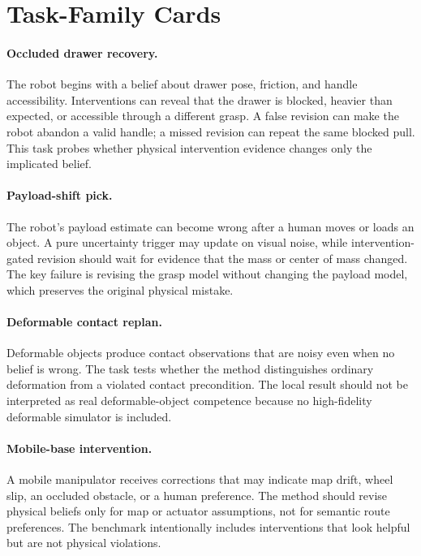 \documentclass{article}
\begin{document}
\clearpage
\section{Task-Family Cards}
\paragraph{Occluded drawer recovery.} The robot begins with a belief about drawer pose, friction, and handle accessibility. Interventions can reveal that the drawer is blocked, heavier than expected, or accessible through a different grasp. A false revision can make the robot abandon a valid handle; a missed revision can repeat the same blocked pull. This task probes whether physical intervention evidence changes only the implicated belief.

\paragraph{Payload-shift pick.} The robot's payload estimate can become wrong after a human moves or loads an object. A pure uncertainty trigger may update on visual noise, while intervention-gated revision should wait for evidence that the mass or center of mass changed. The key failure is revising the grasp model without changing the payload model, which preserves the original physical mistake.

\paragraph{Deformable contact replan.} Deformable objects produce contact observations that are noisy even when no belief is wrong. The task tests whether the method distinguishes ordinary deformation from a violated contact precondition. The local result should not be interpreted as real deformable-object competence because no high-fidelity deformable simulator is included.

\paragraph{Mobile-base intervention.} A mobile manipulator receives corrections that may indicate map drift, wheel slip, an occluded obstacle, or a human preference. The method should revise physical beliefs only for map or actuator assumptions, not for semantic route preferences. The benchmark intentionally includes interventions that look helpful but are not physical violations.
\end{document}

